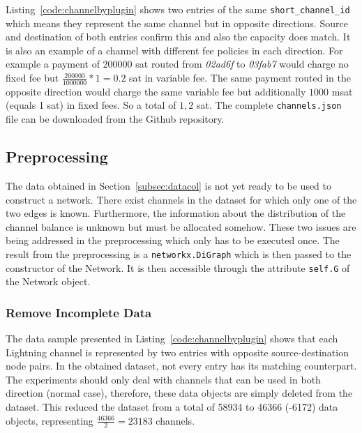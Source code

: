 \documentclass[final]{fhnwreport}       %
\begin{document}
Listing~\ref{code:channelbyplugin} shows two entries of the same \texttt{short\_channel\_id} which means they represent the same channel but in opposite directions. Source and destination of both entries confirm this and also the capacity does match. It is also an example of a channel with different fee policies in each direction. For example a payment of $200000$ sat routed from \emph{02ad6f} to \emph{03fab7} would charge no fixed fee but $\frac{200000}{1000000}*1 = 0.2$ sat in variable fee. The same payment routed in the opposite direction would charge the same variable fee but additionally $1000$ msat (equals 1 sat) in fixed fees. So a total of $1,2$ sat. The complete \texttt{channels.json} file can be downloaded from the Github repository. 

\subsection{Preprocessing}\label{subsec:preproc}
The data obtained in Section~\ref{subsec:datacol} is not yet ready to be used to construct a network. There exist channels in the dataset for which only one of the two edges is known. Furthermore, the information about the distribution of the channel balance is unknown but must be allocated somehow. These two issues are being addressed in the preprocessing which only has to be executed once. The result from the preprocessing is a \texttt{networkx.DiGraph} which is then passed to the constructor of the Network. It is then accessible through the attribute \texttt{self.G} of the Network object.

\subsubsection{Remove Incomplete Data}
The data sample presented in Listing~\ref{code:channelbyplugin} shows that each Lightning channel is represented by two entries with opposite source-destination node pairs. In the obtained dataset, not every entry has its matching counterpart. The experiments should only deal with channels that can be used in both direction (normal case), therefore, these data objects are simply deleted from the dataset. This reduced the dataset from a total of 58934 to 46366 (-6172) data objects, representing $\frac{46366}{2}=23183$ channels.  
\end{document}
